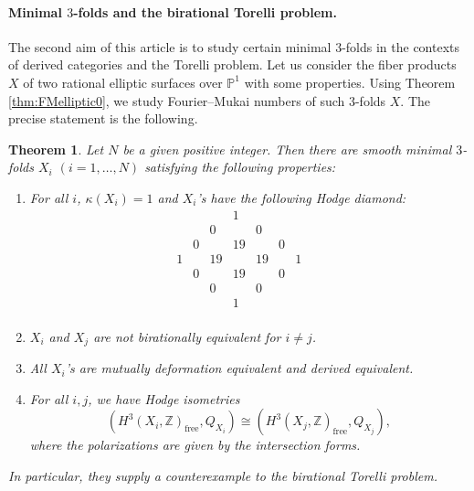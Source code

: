 \documentclass[a4paper,11pt]{article}
\newtheorem{thm}{Theorem}[section]
\theoremstyle{definition}\newtheorem{defn}[thm]{Definition}
\theoremstyle{remark}\newtheorem{remark}[thm]{Remark}
\numberwithin{equation}{section}
\newcommand{\PP}{\mathbb P}
\newcommand{\Z}{\mathbb Z}
\begin{document}

\paragraph{Minimal  $3$-folds and the birational Torelli problem.}
%
The second aim of this article is to study certain minimal  $3$-folds
in the contexts of derived categories and the Torelli problem. 
Let us consider the fiber products $X$ of 
two rational  elliptic surfaces over $\PP ^1$
with some properties.
Using Theorem \ref{thm:FMelliptic0}, 
we study Fourier--Mukai numbers of such $3$-folds $X$.
The precise statement is the following.



\begin{thm}\label{thm:main20}
Let $N$ be a given positive integer.
Then there are smooth minimal  $3$-folds $X_i$ $(i=1,\ldots ,N)$ 
satisfying the following properties: 
%
\begin{enumerate}
\item
For all $i$, $\kappa (X_i)=1$ and $X_i$'s have the following 
Hodge diamond:
$$
\begin{array}{ccccccccc}
 &  &  & 1&  &  &  &  & \\
 &  & 0&  & 0&  &  &  & \\
 & 0&  &19&  & 0&  &  & \\
1&  &19&  &19&  & 1&  & \\
 & 0&  &19&  & 0&  &  & \\
 &  & 0&  & 0&  &  &  & \\
 &  &  & 1&  &  &  &  & \\ 
\end{array}
$$
\item
$X_i$ and $X_j$ are not birationally 
equivalent for $i\ne j$.
\item
All $X_i$'s are mutually deformation equivalent 
and derived equivalent.
\item
For all $i,j$, we have Hodge isometries
$$
(H^3(X_i,\Z)_{\text{free}},Q_{X_i})\cong (H^3(X_j,\Z)_{\text{free}},Q_{X_j}),
$$
where the polarizations are given by the intersection forms.
\end{enumerate}

In particular, they supply a counterexample to the birational 
Torelli problem.
\end{thm}
\end{document}
